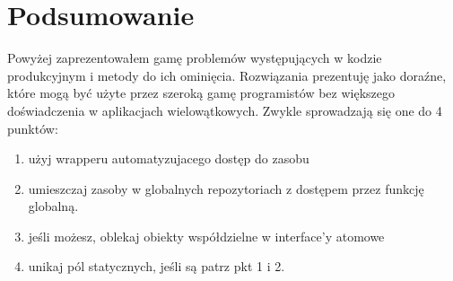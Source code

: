 \section{Podsumowanie}
Powyżej zaprezentowałem gamę problemów występujących w kodzie produkcyjnym i metody do ich ominięcia. Rozwiązania prezentuję jako doraźne, które mogą być użyte przez szeroką gamę programistów bez większego doświadczenia w aplikacjach wielowątkowych. Zwykle sprowadzają się one do 4 punktów:
\begin{enumerate}
\item użyj wrapperu  automatyzujacego dostęp do zasobu
\item umieszczaj zasoby w globalnych repozytoriach z dostępem przez funkcję globalną.
\item jeśli możesz, oblekaj obiekty współdzielne w interface'y atomowe
\item unikaj pól statycznych, jeśli są patrz pkt 1 i 2.
\end{enumerate}

